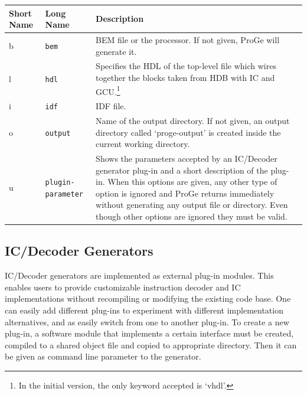 \documentclass[a4paper,twoside]{tceusermanual}
\begin{document}
\begin{center}
\begin{longtable}[htb]{@{}p{}@{}p{}%
                     @{}p{}}

\textbf{Short Name} &\textbf{Long Name} &\textbf{Description} \\
\hline

b & \verb|bem| &
BEM file or the processor. If not given, ProGe will generate it. \\

l & \verb|hdl| &
Specifies the HDL of the top-level file which wires together the blocks
taken from HDB with IC and GCU.\footnote{In the initial version, the only
keyword accepted is `vhdl'.} \\

i & \verb|idf| &
IDF file. \\

o & \verb|output| &%
Name of the output directory. If not given, an output directory called
`proge-output' is created inside the current working directory.
\\

u & \verb|plugin-parameter| &%
Shows the parameters accepted by an IC/Decoder generator plug-in and a short
description of the plug-in. When this options are given, any other type of
option is ignored and ProGe returns immediately without generating any output
file or directory.  Even though other options are ignored they must
be valid.
\\
\end{longtable}
\end{center}

\subsection{IC/Decoder Generators}
\label{ssec:ICDecoderGenerators}

IC/Decoder generators are implemented as external plug-in
modules. This enables users to provide customizable instruction
decoder and IC implementations without recompiling or modifying the
existing code base. One can easily add different plug-ins to
experiment with different implementation alternatives, and as easily
switch from one to another plug-in. To create a new plug-in, a
software module that implements a certain interface must be created,
compiled to a shared object file and copied to appropriate
directory. Then it can be given as command line parameter to the
generator.
\end{document}
